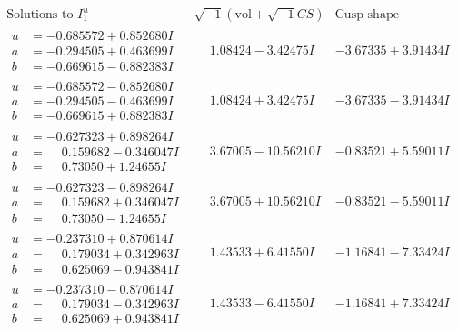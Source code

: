 \documentclass[1p]{elsarticle_modified}
\theoremstyle{definition}
\newcommand{\I}{\sqrt{-1}}
\begin{document}
$$\begin{array}{c|c|c}  
\text{Solutions to }I^u_{1}& \I (\text{vol} + \sqrt{-1}CS) & \text{Cusp shape}\\
 \hline 
\begin{aligned}
u &= -0.685572 + 0.852680 I \\
a &= -0.294505 + 0.463699 I \\
b &= -0.669615 - 0.882383 I\end{aligned}
 & \phantom{-}1.08424 - 3.42475 I & -3.67335 + 3.91434 I \\ \hline\begin{aligned}
u &= -0.685572 - 0.852680 I \\
a &= -0.294505 - 0.463699 I \\
b &= -0.669615 + 0.882383 I\end{aligned}
 & \phantom{-}1.08424 + 3.42475 I & -3.67335 - 3.91434 I \\ \hline\begin{aligned}
u &= -0.627323 + 0.898264 I \\
a &= \phantom{-}0.159682 - 0.346047 I \\
b &= \phantom{-}0.73050 + 1.24655 I\end{aligned}
 & \phantom{-}3.67005 - 10.56210 I & -0.83521 + 5.59011 I \\ \hline\begin{aligned}
u &= -0.627323 - 0.898264 I \\
a &= \phantom{-}0.159682 + 0.346047 I \\
b &= \phantom{-}0.73050 - 1.24655 I\end{aligned}
 & \phantom{-}3.67005 + 10.56210 I & -0.83521 - 5.59011 I \\ \hline\begin{aligned}
u &= -0.237310 + 0.870614 I \\
a &= \phantom{-}0.179034 + 0.342963 I \\
b &= \phantom{-}0.625069 - 0.943841 I\end{aligned}
 & \phantom{-}1.43533 + 6.41550 I & -1.16841 - 7.33424 I \\ \hline\begin{aligned}
u &= -0.237310 - 0.870614 I \\
a &= \phantom{-}0.179034 - 0.342963 I \\
b &= \phantom{-}0.625069 + 0.943841 I\end{aligned}
 & \phantom{-}1.43533 - 6.41550 I & -1.16841 + 7.33424 I \\ \hline\begin{aligned}

\end{aligned}
\end{array}$$
\end{document}
